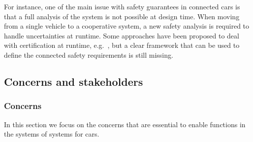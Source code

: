 %
For instance, %
one of the main issue with safety guarantees in connected cars is that a full analysis of the system is not possible at design time. When moving from a single vehicle to a cooperative system, a new safety analysis is required to handle uncertainties at runtime. Some approaches have been proposed to deal with certification at runtime, e.g.~\cite{runtime1, runtime3}, but a clear framework that can be used to define the connected safety requirements is still missing.



\subsection{Concerns and stakeholders} 





\subsubsection{Concerns}\label{vp:concerns}

In this section we focus on the concerns that are essential to enable functions in the systems of systems for cars. %


